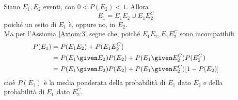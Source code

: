 \documentclass{subfiles}
\begin{document}
Siano \(E_{1}, E_{2}\) eventi, con \(0 < P(E_{2}) < 1\). Allora
\[
    E_{1} = E_{1}E_{2} \cup E_{1}E_{2}^{C}
\]
poiché un esito di \(E_{1}\) è, oppure no, in \(E_{2}\).\\
Ma per l'Assioma \eqref{Axiom:3} segue che, poiché \(E_{1}E_{2}, E_{1}E_{2}^{C}\) sono incompatibili
\[\begin{aligned}
        P(E_{1}) & =  P(E_{1}E_{2}) + P(E_{1}E_{2}^{C})                                      \\
                 & = P(E_{1} \given E_{2})P(E_{2}) + P(E_{1} \given E_{2}^{C})P(E_{2}^{C})   \\
                 & = P(E_{1} \given E_{2})P(E_{2}) + P(E_{1} \given E_{2}^{C})[1 - P(E_{2})] \\
    \end{aligned}\]
cioè \(P(E_{1})\) è la media ponderata della probabilità di \(E_{1}\) dato \(E_{2}\) e della probabilità di \(E_{1}\) dato \(E_{2}^{C}\).
\end{document}
